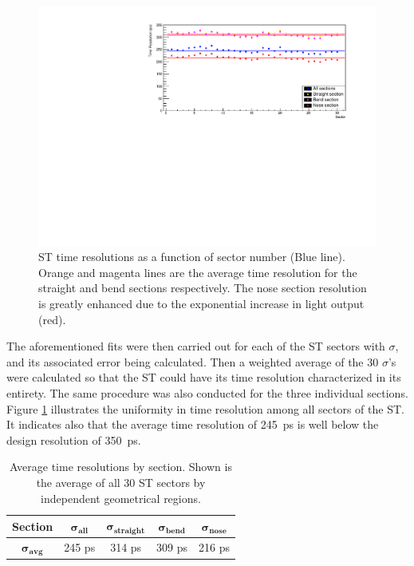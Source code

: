 \begin{figure}[!htb]
		\centering
		\includegraphics[width=1.05\columnwidth]{performance/figs/NIM_TR_ALL}
		\caption{ST time resolutions as a function of sector number (Blue line). Orange and magenta lines are the average time resolution for the straight and bend sections respectively. The nose section resolution is greatly enhanced due to the exponential increase in light output (red).}
		\label{fig:timeresallinset}
	\end{figure}		
The aforementioned fits were then carried out for each of the ST sectors with $\sigma$, and its associated error being calculated.  Then a weighted average of the 30 $\sigma$'s were calculated so that the ST could have its time resolution characterized in its entirety.  The same procedure was also conducted for the three individual sections.  Figure \ref{fig:timeresallinset} illustrates the uniformity in time resolution among all sectors of the ST. It indicates also that the average time resolution of 245~ps is well below the design resolution of 350~ps.
\begin{table}[ch]
	\centering
	\begin{tabular}{|c|c|c|c|c|}
		\hline  \textbf{Section} & $\mathbf{\sigma_{all}}$ & $\mathbf{\sigma_{straight}}$ & $\mathbf{\sigma_{bend}}$ & $\mathbf{\sigma_{nose}}$ \\ 
		\hline $\mathbf{\sigma_{avg}}$ & 245 ps & 314 ps & 309 ps & 216 ps \\ 
		\hline 
	\end{tabular}
	\caption[Average time resolutions by section]{Average time resolutions by section. Shown is the average of all 30 ST sectors by independent geometrical regions.}
	\label{tab:time_res_section}
\end{table}

